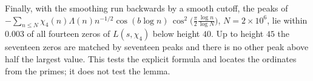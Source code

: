 Finally, with the smoothing run backwards by a smooth cutoff, the peaks of $-\sum_{n\le N}\chi_4(n)\Lambda(n)n^{-1/2}\cos(b\log n)\,\cos^2\big(\tfrac\pi2\tfrac{\log n}{\log N}\big)$, $N=2\times10^6$, lie within $0.003$ of all fourteen zeros of $L(s,\chi_4)$ below height $40$. Up to height $45$ the seventeen zeros are matched by seventeen peaks and there is no other peak above half the largest value. This tests the explicit formula and locates the ordinates from the primes; it does not test the lemma.
